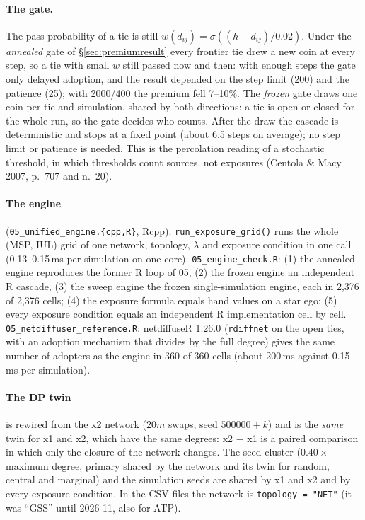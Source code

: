 \documentclass[11pt,a4paper]{article}
\newcommand{\code}[1]{\texttt{#1}}
\begin{document}
\paragraph{The gate.} The pass probability of a tie is still
$w(d_{ij}) = \sigma((h - d_{ij})/0.02)$. Under the \emph{annealed} gate of
\S\ref{sec:premiumresult} every frontier tie drew a new coin at every step, so a tie with
small $w$ still passed now and then: with enough steps the gate only delayed adoption, and
the result depended on the step limit (200) and the patience (25); with 2000/400 the
premium fell 7--10\%. The \emph{frozen} gate draws one coin per tie and simulation, shared
by both directions: a tie is open or closed for the whole run, so the gate decides who
counts. After the draw the cascade is deterministic and stops at a fixed point (about 6.5
steps on average); no step limit or patience is needed. This is the percolation reading of
a stochastic threshold, in which thresholds count sources, not exposures (Centola \& Macy
2007, p.~707 and n.~20).

\paragraph{The engine} (\code{05\_unified\_engine.\{cpp,R\}}, Rcpp).
\code{run\_exposure\_grid()} runs the whole (MSP, IUL) grid of one network, topology,
$\lambda$ and exposure condition in one call (0.13--0.15\,ms per simulation on one core).
\code{05\_engine\_check.R}: (1) the annealed engine reproduces the former R loop of 05,
(2) the frozen engine an independent R cascade, (3) the sweep engine the frozen
single-simulation engine, each in 2{,}376 of 2{,}376 cells; (4) the exposure formula
equals hand values on a star ego; (5) every exposure condition equals an independent R
implementation cell by cell. \code{05\_netdiffuser\_reference.R}: netdiffuseR 1.26.0
(\code{rdiffnet} on the open ties, with an adoption mechanism that divides by the full
degree) gives the same number of adopters as the engine in 360 of 360 cells (about 200\,ms
against 0.15\,ms per simulation).

\paragraph{The DP twin} is rewired from the x2 network ($20m$ swaps, seed $500000 + k$)
and is the \emph{same} twin for x1 and x2, which have the same degrees: x2 $-$ x1 is a
paired comparison in which only the closure of the network changes. The seed cluster
($0.40 \times$ maximum degree, primary shared by the network and its twin for random,
central and marginal) and the simulation seeds are shared by x1 and x2 and by every
exposure condition. In the CSV files the network is \code{topology = "NET"} (it was
``GSS'' until 2026-11, also for ATP).
\end{document}
